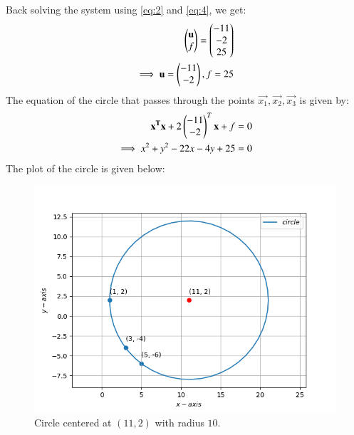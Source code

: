 \documentclass[journal,12pt,twocolumn]{IEEEtran}
\begin{document}
Back solving the system using \eqref{eq:2} and \eqref{eq:4}, we get:
\begin{align}
\begin{pmatrix}\mathbf{u}\\f\end{pmatrix}=\begin{pmatrix}-11 \\ -2 \\ 25\end{pmatrix} \\
\implies \mathbf{u} = \begin{pmatrix}-11 \\ -2\end{pmatrix}, f = 25
\end{align}
The equation of the circle that passes through the points $\vec{x_1}, \vec{x_2}, \vec{x_3}$ is given by:
\begin{align}
\mathbf{x^Tx}+2\begin{pmatrix}-11 \\ -2\end{pmatrix}^T\mathbf{x}+f = 0 \\
\implies x^2 + y^2 - 22x -4y + 25 = 0
\end{align}
The plot of the circle is given below:
\begin{figure}[t]
\centering
    \includegraphics[width=\columnwidth]{Figure_1.png}
    \caption{Circle centered at $(11, 2)$ with radius $10$.}
    \label{fig:1}
\end{figure}
\end{document}
